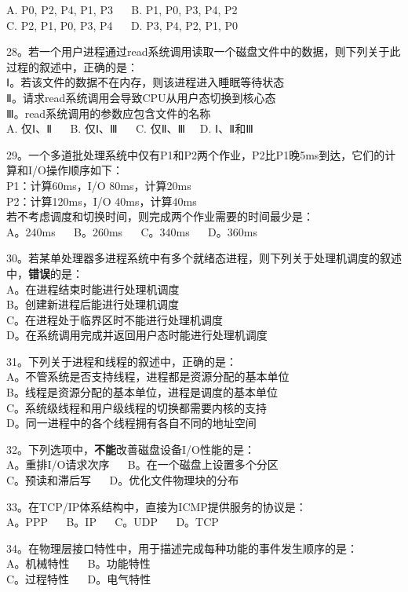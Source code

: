 A. P0, P2, P4, P1, P3 $\quad$ B. P1, P0, P3, P4, P2 \\
C. P2, P1, P0, P3, P4 $\quad$ D. P3, P4, P2, P1, P0

28。若一个用户进程通过read系统调用读取一个磁盘文件中的数据，则下列关于此过程的叙述中，正确的是：\\
Ⅰ。若该文件的数据不在内存，则该进程进入睡眠等待状态\\
Ⅱ。请求read系统调用会导致CPU从用户态切换到核心态\\
Ⅲ。read系统调用的参数应包含文件的名称\\
A. 仅Ⅰ、Ⅱ $\quad$ B. 仅Ⅰ、Ⅲ $\quad$ C. 仅Ⅱ、Ⅲ  $\quad$D. Ⅰ、Ⅱ和Ⅲ

29。一个多道批处理系统中仅有P1和P2两个作业，P2比P1晚5ms到达，它们的计算和I/O操作顺序如下：\\
P1：计算60ms，I/O 80ms，计算20ms\\
P2：计算120ms，I/O 40ms，计算40ms\\
若不考虑调度和切换时间，则完成两个作业需要的时间最少是：\\
A。240ms $\quad$ B。260ms $\quad$ C。340ms $\quad$ D。360ms

30。若某单处理器多进程系统中有多个就绪态进程，则下列关于处理机调度的叙述中，\textbf{错误}的是：\\
A。在进程结束时能进行处理机调度\\
B。创建新进程后能进行处理机调度\\
C。在进程处于临界区时不能进行处理机调度\\
D。在系统调用完成并返回用户态时能进行处理机调度

31。下列关于进程和线程的叙述中，正确的是：\\
A。不管系统是否支持线程，进程都是资源分配的基本单位\\
B。线程是资源分配的基本单位，进程是调度的基本单位\\
C。系统级线程和用户级线程的切换都需要内核的支持\\
D。同一进程中的各个线程拥有各自不同的地址空间

32。下列选项中，\textbf{不能}改善磁盘设备I/O性能的是： \\
A。重排I/O请求次序 $\quad$ B。在一个磁盘上设置多个分区 \\
C。预读和滞后写 $\quad$ D。优化文件物理块的分布

33。在TCP/IP体系结构中，直接为ICMP提供服务的协议是：\\
A。PPP $\quad$ B。IP $\quad$ C。UDP $\quad$ D。TCP

34。在物理层接口特性中，用于描述完成每种功能的事件发生顺序的是：\\
A。机械特性 $\quad$ B。功能特性 \\
C。过程特性 $\quad$ D。电气特性

